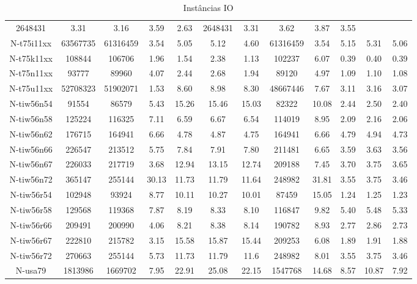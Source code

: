 \documentclass[a4paper,10pt,onecolumn]{article}
\begin{document}
{\begin{table}[htbp]
\begin{tabular}{|c|c|ccccc|ccccc|}
2648431 & 3.31 & 3.16   & 3.59  & 2.63 
&
2648431 & 3.31 & 3.62   & 3.87  & 3.55 
\\
N-t75i11xx & 63567735 &
61316459 & 3.54 & 5.05   & 5.12  & 4.60 
&
61316459 & 3.54 & 5.15   & 5.31  & 5.06 
\\
N-t75k11xx & 108844 &
106706 & 1.96 & 1.54   & 2.38  & 1.13 
&
102237 & 6.07 & 0.39   & 0.40  & 0.39 
\\
N-t75n11xx & 93777 &
89960 & 4.07 & 2.44   & 2.68  & 1.94 
&
89120 & 4.97 & 1.09   & 1.10  & 1.08 
\\
N-t75u11xx & 52708323 &
51902071 & 1.53 & 8.60   & 8.98  & 8.30 
&
48667446 & 7.67 & 3.11   & 3.16  & 3.07 
\\
N-tiw56n54 & 91554 &
86579 & 5.43 & 15.26   & 15.46  & 15.03 
&
82322 & 10.08 & 2.44   & 2.50  & 2.40 
\\
N-tiw56n58 & 125224 &
116325 & 7.11 & 6.59   & 6.67  & 6.54 
&
114019 & 8.95 & 2.09   & 2.16  & 2.06 
\\
N-tiw56n62 & 176715 &
164941 & 6.66 & 4.78   & 4.87  & 4.75 
&
164941 & 6.66 & 4.79   & 4.94  & 4.73 
\\
N-tiw56n66 & 226547 &
213512 & 5.75 & 7.84   & 7.91  & 7.80 
&
211481 & 6.65 & 3.59   & 3.63  & 3.56 
\\
N-tiw56n67 & 226033 &
217719 & 3.68 & 12.94   & 13.15  & 12.74 
&
209188 & 7.45 & 3.70   & 3.75  & 3.65 
\\
    N-tiw56n72 & 365147 &
255144 & 30.13 & 11.73   & 11.79  & 11.64 &
248982 & 31.81 & 3.55   & 3.75  & 3.46 
\\
    N-tiw56r54 & 102948 &
93924 & 8.77 & 10.11   & 10.27  & 10.01 &
87459 & 15.05 & 1.24   & 1.25  & 1.23 
\\
    N-tiw56r58 & 129568 &
119368 & 7.87 & 8.19   & 8.33  & 8.10 &
116847 & 9.82 & 5.40   & 5.48  & 5.33
\\
    N-tiw56r66 & 209491 &
200990 & 4.06 & 8.21   & 8.38  & 8.14 &
190782 & 8.93 & 2.77   & 2.86  & 2.73 
\\
    N-tiw56r67 & 222810 &
215782 & 3.15 & 15.58   & 15.87  & 15.44 &
209253 & 6.08 & 1.89   & 1.91  & 1.88 
\\
    N-tiw56r72 & 270663 &
255144 & 5.73 & 11.73   & 11.79  & 11.6 &
248982 & 8.01 & 3.55   & 3.75  & 3.46 
\\
    N-usa79 & 1813986 &
1669702 & 7.95 & 22.91   & 25.08  & 22.15 &
1547768 & 14.68 & 8.57   & 10.87  & 7.92 
\\

\hline
  \end{tabular}
  \caption{Instâncias IO}
  \label{table:io}
\end{table}
\restoregeometry
\clearpage
}
\end{document}
